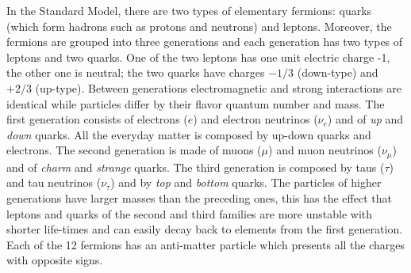 In the Standard Model, there are two types of elementary fermions: quarks (which form hadrons such as protons and neutrons) and leptons. 
Moreover, the fermions are grouped into three generations and each generation has two types of leptons and two quarks. One of the two leptons has one unit electric charge -1, the other one is neutral; the two quarks have charges $-1/3$ (down-type) and $+2/3$ (up-type). Between generations electromagnetic and strong interactions are identical while particles differ by their flavor quantum number and mass.  The first generation consists of electrons ($e$) and electron neutrinos ($\nu_e$) and of \emph{up} and \emph{down} quarks. All the everyday matter is composed by up-down quarks and electrons. The second generation is made of muons ($\mu$) and muon neutrinos ($\nu_\mu$) and of \emph{charm} and \emph{strange} quarks. The third generation is composed by taus ($\tau$) and tau neutrinos ($\nu_\tau$) and by \emph{top} and \emph{bottom} quarks. The particles of higher generations have larger masses than the preceding ones, this has the effect that leptons and quarks of the second and third families are more unstable with shorter life-times and can easily decay back to elements from the first generation.\\
Each of the 12 fermions has an anti-matter particle which presents all the charges with opposite signs.

